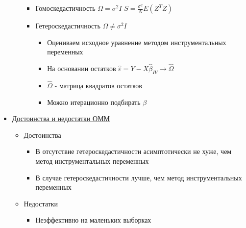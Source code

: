 \documentclass[a4paper, 12pt]{article}
\begin{document}
\begin{itemize}
\begin{itemize}
        \begin{itemize}
            \item Гомоскедастичность
            $\Omega = \sigma^{2}I$
            $S = \frac{\sigma^{2}}{N}E(Z^{T}Z)$
            \item Гетероскедастичность
            $\Omega \neq \sigma^{2}I$
            \begin{itemize}
                \item Оцениваем исходное уравнение методом инструментальных переменных
                \item На основании остатков $\hat{\varepsilon} = Y - X\hat{\beta}_{IV} \rightarrow \hat{\Omega}$
                \item $\hat{\Omega}$ - матрица квадратов остатков
                \item Можно итерационно подбирать $\beta$
            \end{itemize}
        \end{itemize}
    \end{itemize}
    \item \underline{Достоинства и недостатки ОММ}
    \begin{itemize}
        \item Достоинства
        \begin{itemize}
            \item В отсутствие гетероскедастичности асимптотически не хуже, чем метод инструментальных переменных
            \item В случае гетероскедастичности лучше, чем метод инструментальных переменных
        \end{itemize}
        \item Недостатки
        \begin{itemize}
            \item Неэффективно на маленьких выборках
        \end{itemize}
    \end{itemize}
\end{itemize}
\end{document}
